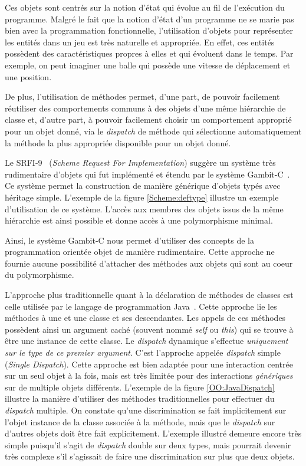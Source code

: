 \documentclass[12pt,oneside,letterpaper,francais]{book}
\begin{document}
Ces objets sont centrés sur la notion d'état qui évolue au fil de
l'exécution du programme. Malgré le fait que la notion d'état d'un
programme ne se marie pas bien avec la programmation fonctionnelle,
l'utilisation d'objets pour représenter les entités dans un jeu est
très naturelle et appropriée. En effet, ces entités possèdent des
caractéristiques propres à elles et qui évoluent dans le temps. Par
exemple, on peut imaginer une balle qui possède une vitesse de
déplacement et une position.

De plus, l'utilisation de méthodes permet, d'une part, de pouvoir
facilement réutiliser des comportements communs à des objets d'une
même hiérarchie de classe et, d'autre part, à pouvoir facilement
choisir un comportement approprié pour un objet donné, via le
\textit{dispatch} de méthode qui sélectionne automatiquement la
méthode la plus appropriée disponible pour un objet donné.

Le SRFI-9~\cite{SRFI_9} (\textit{Scheme Request For Implementation})
suggère un système très rudimentaire d'objets qui fut implémenté et
étendu par le système Gambit-C~\cite{Gambit4}. Ce système permet la
construction de manière générique d'objets typés avec héritage
simple. L'exemple de la figure \ref{Scheme:deftype} illustre un
exemple d'utilisation de ce système. L'accès aux membres des objets
issus de la même hiérarchie est ainsi possible et donne accès à une
polymorphisme minimal.

Ainsi, le système Gambit-C nous permet d'utiliser des concepts de la
programmation orientée objet de manière rudimentaire. Cette approche
ne fournie aucune possibilité d'attacher des méthodes aux objets qui
sont au coeur du polymorphisme.

L'approche plus traditionnelle quant à la déclaration de méthodes de
classes est celle utilisée par le langage de programmation
Java~\cite{JavaSpec}. Cette approche lie les méthodes à une et une
classe et ses descendantes. Les appels de ces méthodes possèdent ainsi
un argument caché (souvent nommé \textit{self} ou \textit{this}) qui
se trouve à être une instance de cette classe. Le \textit{dispatch}
dynamique s'effectue \emph{uniquement sur le type de ce premier
  argument}. C'est l'approche appelée \textit{dispatch} simple
(\textit{Single Dispatch}). Cette approche est bien adaptée pour une
interaction centrée sur un seul objet à la fois, mais est très limitée
pour des interactions \emph{génériques} sur de multiple objets
différents. L'exemple de la figure \ref{OO:JavaDispatch} illustre la
manière d'utiliser des méthodes traditionnelles pour effectuer du
\textit{dispatch} multiple. On constate qu'une discrimination se fait
implicitement sur l'objet instance de la classe associée à la méthode,
mais que le \textit{dispatch} sur d'autres objets doit être fait
explicitement. L'exemple illustré demeure encore très simple puisqu'il
s'agit de \textit{dispatch} double sur deux types, mais pourrait
devenir très complexe s'il s'agissait de faire une discrimination sur
plus que deux objets.
\end{document}
